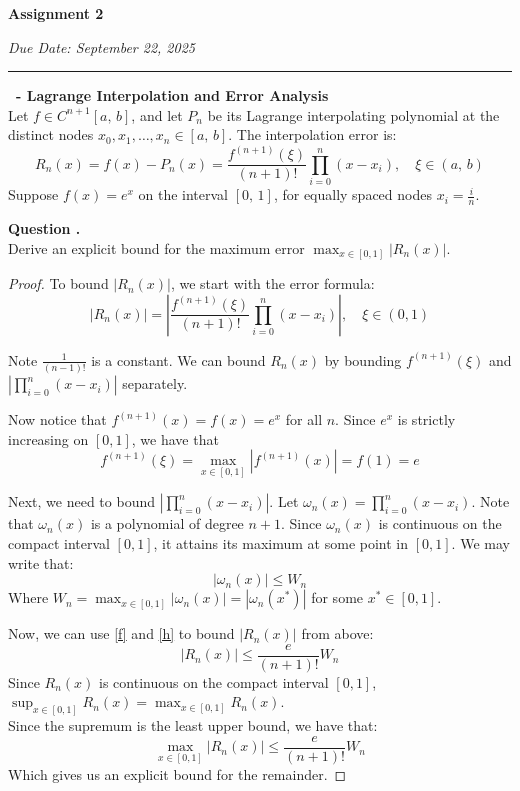 \documentclass[12pt]{article}
\newcounter{question}
\newcounter{subquest}
\newcommand{\question}[1]{
    \stepcounter{question} 
    \vspace{1em}
    \textbf{\Large\thequestion \ - #1}
    \vspace{.5em} 
    \setcounter{subquest}{0}\ \\}
\newcommand{\subquestion}{
    \stepcounter{subquest} 
    \vspace{.5em}
    \textbf{\large Question \thequestion.\thesubquest}
    \vspace{.25em}\ \\}
\begin{document}
\begin{center}
\textbf{\huge Assignment 2}

{\large\emph{Due Date: September 22, 2025}}
\vspace{1em}
\end{center}
\hrule

\question{Lagrange Interpolation and Error Analysis}
Let $f \in C^{n+1}[a,\,b]$, and let $P_n$ be its Lagrange interpolating polynomial at the distinct nodes $x_0, x_1, \dots, x_n \in [a,\,b]$. The interpolation error is: 
\[R_n(x) = f(x) - P_n(x) = \frac{f^{(n+1)}(\xi)}{(n+1)!} \prod_{i=0}^{n}(x - x_i),\quad \xi \in (a,\,b)\]
Suppose $f(x) = e^x$ on the interval $[0,\,1]$, for equally spaced nodes $x_i = \frac{i}{n}$.

\subquestion
Derive an explicit bound for the maximum error $\max_{x \in [0,1]} |R_n(x)|$.


\begin{proof}
    To bound $|R_n(x)|$, we start with the error formula:
    \[|R_n(x)| = \left|\frac{f^{(n+1)}(\xi)}{(n+1)!} \prod_{i=0}^{n}(x - x_i)\right|, \quad \xi \in (0,1)\]
    
    Note $\frac{1}{(n-1)!}$ is a constant. We can bound $R_n(x)$ by bounding $f^{(n+1)}(\xi)$ and $\left|\prod_{i=0}^{n}(x - x_i)\right|$ separately.
    
    Now notice that $f^{(n+1)}(x) = f(x) = e^x$ for all $n$. Since $e^x$ is strictly increasing on $[0,1]$, we have that \[f^{(n+1)}(\xi) = \max_{x \in [0,1]} |f^{(n+1)}(x)| = f(1) = e \label{f}\tag{1}\]

    Next, we need to bound $\left|\prod_{i=0}^{n}(x - x_i)\right|$. Let $\omega_{n}(x) = \prod_{i=0}^{n}(x - x_i)$. Note that $\omega_{n}(x)$ is a polynomial of degree $n+1$. Since $\omega_{n}(x)$ is continuous on the compact interval $[0,1]$, it attains its maximum at some point in $[0,1]$. We may write that: 
    \[|\omega_{n}(x)| \leq W_n \label{h}\tag{2}\]
    Where $W_n = \max_{x \in [0,1]} |\omega_{n}(x)| = |\omega_{n}(x^*)|$ for some $x^* \in [0,1]$.

    Now, we can use \eqref{f} and \eqref{h} to bound $|R_n(x)|$ from above:
    \[|R_n(x)| \leq \frac{e}{(n+1)!} W_n\]
    Since $R_n(x)$ is continuous on the compact interval $[0,1]$, $\sup_{x\in[0,1]} R_n(x) = \max_{x\in[0,1]} R_n(x)$. \\ Since the supremum is the least upper bound, we have that:
    \[\max_{x \in [0,1]} |R_n(x)| \leq \frac{e}{(n+1)!} W_n\]
    Which gives us an explicit bound for the remainder.
\end{proof}
\end{document}

